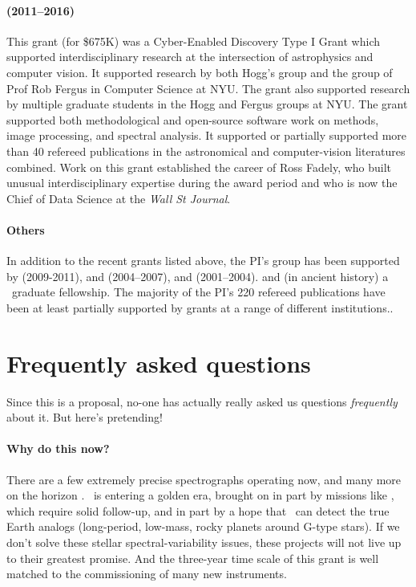 \documentclass[12pt, letterpaper]{article}
\begin{document}
\paragraph{
 (2011--2016)}
This grant (for \$675K) was a Cyber-Enabled Discovery Type I Grant
which supported interdisciplinary research at the intersection of
astrophysics and computer vision.  It supported research by both
Hogg's group and the group of Prof Rob Fergus in Computer Science at
NYU.
The grant also supported research by multiple graduate students in the
Hogg and Fergus groups at NYU.
The grant supported both methodological and open-source software work
on  methods, image processing, and spectral analysis.
It supported or partially supported
more than 40 refereed publications in the astronomical and
computer-vision literatures combined.
Work on this grant established the career of Ross Fadely, who built unusual
interdisciplinary expertise during the award period and who is now the
Chief of Data Science at the \textit{Wall St Journal}.

\paragraph{Others}
In addition to the recent grants listed above, the PI's group has been supported by
 (2009-2011),
and
 (2004--2007),
and
 (2001--2004).
and (in ancient history) a \NSF\ graduate fellowship.
The majority of the PI's 220 refereed publications have been at least partially supported
by \NSF grants at a range of different institutions..

\section{Frequently asked questions}

Since this is a proposal, no-one has actually really asked us
questions \emph{frequently} about it.
But here's pretending!

\paragraph{Why do this now?}
There are a few extremely precise spectrographs operating now, 
and many more on the horizon \citep{Wright2017}.
\EPRV\ is entering a golden era, brought on in part by missions like
\TESS, which require solid follow-up, and in part by a hope that
\EPRV\ can detect the true Earth analogs (long-period, low-mass, rocky
planets around G-type stars).
If we don't solve these stellar spectral-variability issues, these
projects will not live up to their greatest promise.
And the three-year time scale of this grant is well matched to the
commissioning of many new instruments.
\end{document}
